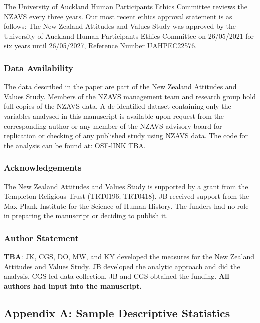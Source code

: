 \documentclass[
  single column]{article}
\begin{document}
The University of Auckland Human Participants Ethics Committee reviews
the NZAVS every three years. Our most recent ethics approval statement
is as follows: The New Zealand Attitudes and Values Study was approved
by the University of Auckland Human Participants Ethics Committee on
26/05/2021 for six years until 26/05/2027, Reference Number UAHPEC22576.

\subsubsection{Data Availability}\label{data-availability}

The data described in the paper are part of the New Zealand Attitudes
and Values Study. Members of the NZAVS management team and research
group hold full copies of the NZAVS data. A de-identified dataset
containing only the variables analysed in this manuscript is available
upon request from the corresponding author or any member of the NZAVS
advisory board for replication or checking of any published study using
NZAVS data. The code for the analysis can be found at: OSF-lINK TBA.

\subsubsection{Acknowledgements}\label{acknowledgements}

The New Zealand Attitudes and Values Study is supported by a grant from
the Templeton Religious Trust (TRT0196; TRT0418). JB received support
from the Max Plank Institute for the Science of Human History. The
funders had no role in preparing the manuscript or deciding to publish
it.

\subsubsection{Author Statement}\label{author-statement}

\textbf{TBA}: JK, CGS, DO, MW, and KY developed the measures for the New
Zealand Attitudes and Values Study. JB developed the analytic approach
and did the analysis. CGS led data collection. JB and CGS obtained the
funding. \textbf{All authors had input into the manuscript.}

\newpage{}

\subsection{Appendix A: Sample Descriptive Statistics}\label{appendix-a}
\end{document}
